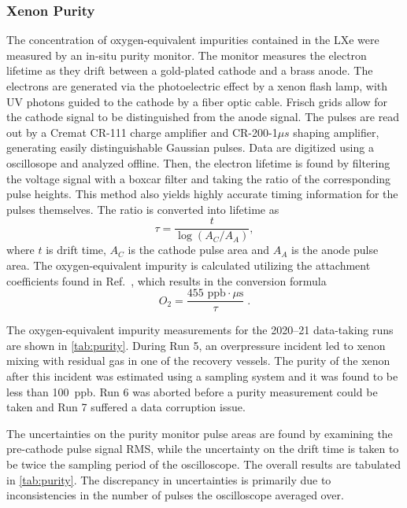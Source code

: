 \subsubsection{Xenon Purity}
\label{sec:Purity}
The concentration of oxygen-equivalent impurities contained in the LXe were measured by an in-situ purity monitor.
The monitor measures the electron lifetime as they drift between a gold-plated cathode and a brass anode.
The electrons are generated via the photoelectric effect by a xenon flash lamp, with UV photons guided to the cathode by a fiber optic cable. 
Frisch grids allow for the cathode signal to be distinguished from the anode signal. The pulses are read out by a Cremat CR-111 charge amplifier and CR-200-1$\mu s$ shaping amplifier, generating easily distinguishable Gaussian pulses. Data are digitized using a oscillosope and analyzed offline.
Then, the electron lifetime is found by filtering the voltage signal with a boxcar filter and taking the ratio of the corresponding pulse heights.
This method also yields highly accurate timing information for the pulses themselves.
The ratio is converted into lifetime as
%
\begin{equation}
    \tau = \frac{t}{\log(A_C/A_A)} ,
    \label{eqn:lifetime}
\end{equation}
\noindent
where $t$ is drift time, $A_C$ is the cathode pulse area and $A_A$ is the anode pulse area. The oxygen-equivalent impurity is calculated utilizing the attachment coefficients found in Ref.~\cite{bakale_effect_1976}, which results in the conversion formula
%
\begin{equation}
{O_2}  = \frac{455 \text{ ppb} \cdot \mu \mathrm{s}}{\tau}\;.
\label{eqn:purity}
\end{equation}
%

The oxygen-equivalent impurity measurements for the 2020--21 data-taking runs are shown in \ref{tab:purity}. 
During Run 5, an overpressure incident led to xenon mixing with residual gas in one of the recovery vessels.
The purity of the xenon after this incident was estimated using a sampling system and it was found to be less than 100~ppb.
Run 6 was aborted before a purity measurement could be taken and Run 7 suffered a data corruption issue. 

The uncertainties on the purity monitor pulse areas are found by examining the pre-cathode pulse signal RMS, while the uncertainty on the drift time is taken to be twice the sampling period of the oscilloscope.
The overall results are tabulated in \ref{tab:purity}.
The discrepancy in uncertainties is primarily due to inconsistencies in the number of pulses the oscilloscope averaged over.

